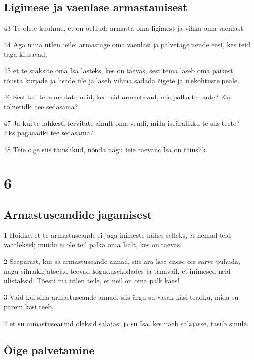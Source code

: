 \section*{Ligimese ja vaenlase armastamisest}

\par 43 Te olete kuulnud, et on öeldud: armasta oma ligimest ja vihka oma vaenlast.
\par 44 Aga mina ütlen teile: armastage oma vaenlasi ja palvetage nende eest, kes teid taga kiusavad,
\par 45 et te saaksite oma Isa lasteks, kes on taevas, sest tema laseb oma päikest tõusta kurjade ja heade üle ja laseb vihma sadada õigete ja ülekohtuste peale.
\par 46 Sest kui te armastate neid, kes teid armastavad, mis palka te saate? Eks tölneridki tee sedasama?
\par 47 Ja kui te lahkesti tervitate ainult oma vendi, mida iseäralikku te siis teete? Eks paganadki tee sedasama?
\par 48 Teie olge siis täiuslikud, nõnda nagu teie taevane Isa on täiuslik.


\chapter{6}

\section*{Armastuseandide jagamisest}

\par 1 Hoidke, et te armastuseande ei jaga inimeste nähes selleks, et nemad teid vaatleksid; muidu ei ole teil palka oma Isalt, kes on taevas.
\par 2 Seepärast, kui sa armastuseande annad, siis ära lase enese ees sarve puhuda, nagu silmakirjatsejad teevad kogudusekodades ja tänavail, et inimesed neid ülistaksid. Tõesti ma ütlen teile, et neil on oma palk käes!
\par 3 Vaid kui sina armastuseande annad, siis ärgu su vasak käsi teadku, mida su parem käsi teeb,
\par 4 et su armastuseannid oleksid salajas; ja su Isa, kes näeb salajasse, tasub sinule.

\section*{Õige palvetamine}

